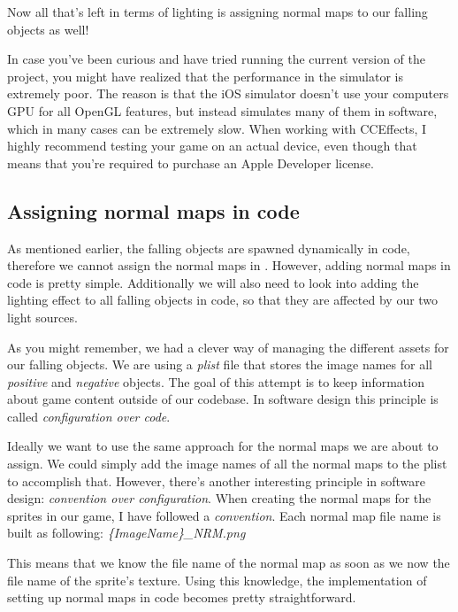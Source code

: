 Now all that's left in terms of lighting is assigning normal maps to
our falling objects as well!

\begin{details}[frametitle={Testing lighting effects on the simulator}]
In case you've been curious and have tried running the current version of the
project, you might have realized that the performance in the simulator is
extremely poor. The reason is that the iOS simulator doesn't use your computers
GPU for all OpenGL features, but instead simulates many of them in software,
which in many cases can be extremely slow. When working with CCEffects, I highly
recommend testing your game on an actual device, even though that means that
you're required to purchase an Apple Developer license.
\end{details}

\subsection{Assigning normal maps in code}
As mentioned earlier, the falling objects are spawned dynamically in code,
therefore we cannot assign the normal maps in \SB{}. However, adding normal
maps in code is pretty simple. Additionally we will also need to look into
adding the lighting effect to all falling objects in code, so that they are
affected by our two light sources.

As you might remember, we had a clever way of managing the different assets for
our falling objects. We are using a \textit{plist} file that stores the image
names for all \textit{positive} and \textit{negative} objects. The goal of this
attempt is to keep information about game content outside of our codebase. In
software design this principle is called \textit{configuration over code}.

Ideally we want to use the same approach for the normal maps we are about to
assign. We could simply add the image names of all the normal maps to the plist
to accomplish that. However, there's another interesting principle in software
design: \textit{convention over configuration}. When creating the normal maps
for the sprites in our game, I have followed a \textit{convention}. Each normal
map file name is built as following: \textit{\{ImageName\}\_NRM.png}

This means that we know the file name of the normal map as soon as we now the
file name of the sprite's texture. Using this knowledge, the implementation of
setting up normal maps in code becomes pretty straightforward.

